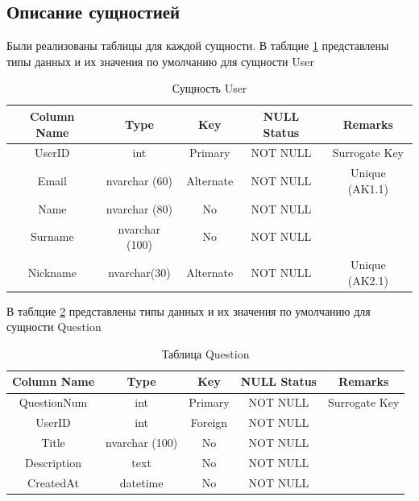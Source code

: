 \documentclass[a4paper, 14pt]{extarticle}
\begin{document}
\subsection{Описание сущностией}

Были реализованы таблицы для каждой сущности. В таблцие \ref{tab:user_tab} представлены типы данных и их значения по умолчанию для сущности User

\begin{table}[H]
\centering
\caption{Сущность User}
\label{tab:user_tab}
\setlength\extrarowheight{2pt}
\begin{tabular}{|c|c|c|c|c|}
\hline
\textbf{Column Name} & \textbf{Type} & \textbf{Key} & \textbf{NULL Status} & \textbf{Remarks} \\
\hline
UserID & int & Primary & NOT NULL & Surrogate Key \\
\hline
Email & nvarchar (60) & Alternate & NOT NULL & Unique (AK1.1) \\
\hline
Name & nvarchar (80) & No & NOT NULL & \\
\hline
Surname & nvarchar (100) & No & NOT NULL & \\
\hline
Nickname & nvarchar(30) & Alternate & NOT NULL & Unique (AK2.1) \\
\hline
\end{tabular}
\end{table}


В таблцие \ref{tab:question_tab} представлены типы данных и их значения по умолчанию для сущности Question

\begin{table}[H]
\centering
\caption{Таблица Question}
\label{tab:question_tab}
\setlength\extrarowheight{2pt}
\begin{tabular}{|c|c|c|c|c|}
\hline
\textbf{Column Name} & \textbf{Type} & \textbf{Key} & \textbf{NULL Status} & \textbf{Remarks} \\
\hline
QuestionNum & int & Primary & NOT NULL & Surrogate Key \\
\hline
UserID & int & Foreign & NOT NULL & \\
\hline
Title & nvarchar (100) & No & NOT NULL & \\
\hline
Description & text & No & NOT NULL & \\
\hline
CreatedAt & datetime & No & NOT NULL & \\
\hline
\end{tabular}
\end{table}

\newpage
\end{document}
